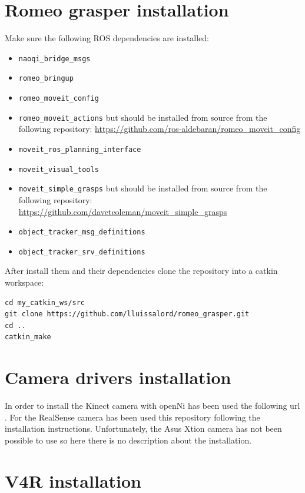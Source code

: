 \documentclass[12pt,a4paper,final,twoside,openright]{report}
\begin{document}
\section{Romeo grasper installation}

Make sure the following ROS dependencies are installed:

\begin{itemize}
\item \texttt{naoqi\_bridge\_msgs}
\item \texttt{romeo\_bringup}
\item \texttt{romeo\_moveit\_config}
\item \texttt{romeo\_moveit\_actions} but should be installed from source from the following repository:
\url{https://github.com/ros-aldebaran/romeo_moveit_config}
\item \texttt{moveit\_ros\_planning\_interface}
\item \texttt{moveit\_visual\_tools}
\item \texttt{moveit\_simple\_grasps} but should be installed from source from the following repository:
\url{https://github.com/davetcoleman/moveit_simple_grasps}
\item \texttt{object\_tracker\_msg\_definitions}
\item \texttt{object\_tracker\_srv\_definitions}
\end{itemize}

After install them and their dependencies clone the repository into a catkin workspace:

\begin{lstlisting}[language=Git]
cd my_catkin_ws/src
git clone https://github.com/lluissalord/romeo_grasper.git
cd ..
catkin_make
\end{lstlisting}

\section{Camera drivers installation}
\label{app:camera_instal}

In order to install the Kinect camera with openNi has been used the following url \cite{Li}. For the RealSense camera has been used this repository \cite{gitRealSense} following the installation instructions. Unfortunately, the Asus Xtion camera has not been possible to use so here there is no description about the installation.

\section{V4R installation}
\end{document}
